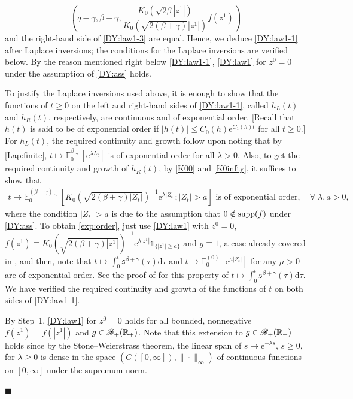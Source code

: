 \documentclass[12pt, twoside]{article}
\numberwithin{figure}{section}
\newcommand{\e}{{\mathrm e}}
\newcommand{\1}{\mathds 1}
\newcommand{\B}{\mathscr B}
\newcommand{\da}{{\downarrow}}
\newcommand{\supp}{{\rm supp}}
\newcommand{\E}{{\mathbb E}}
\renewcommand{\d}{{\mathrm d}}
\newcommand{\R}{{\Bbb R}}
\newcommand{\2}{{\mathbf 1}}
\newcommand{\s}{{\mathfrak s}}
\renewenvironment{proof}[1][\proofname]{\noindent {\bfseries #1.}\;}{\hfill\ensuremath{\blacksquare}\\}
\begin{document}
\begin{proof}[Proof of Theorem~\ref{thm:formulas}]
\[
\left(q-\gamma,\beta+\gamma,\frac{K_0(\sqrt{2\beta}|z^1|)}{K_0(\sqrt{2(\beta+\gamma)}|z^1|)}f(z^1)\right)
\]
and the right-hand side of \eqref{DY:law1-3} are equal. Hence, we deduce \eqref{DY:law1-1} after Laplace inversions; the conditions for the Laplace inversions are verified below. By the reason mentioned right below \eqref{DY:law1-1}, \eqref{DY:law1} for $z^0=0$ under the assumption of \eqref{DY:ass} holds.

To justify the Laplace inversions used above, it is enough to show that the functions of $t\geq 0$ on the left and right-hand sides of \eqref{DY:law1-1}, called $h_L(t)$ and $h_R(t)$, respectively, are continuous and of exponential order. [Recall that $h(t)$ is said to be of exponential order if $|h(t)|\leq C_0(h)\e^{C_1(h)t}$ for all $t\geq 0$.]  For $h_L(t)$, the required continuity and growth follow upon noting that by \eqref{Lap:finite}, $t\mapsto \E^{\beta\da}_0[\e^{\lambda L_t}]$ is of exponential order for all $\lambda>0$.  Also, to get the required continuity and growth of $h_R(t)$, by \eqref{K00} and \eqref{K0infty}, it suffices to show that 
\begin{align}\label{exp:order}
t\mapsto \E^{(\beta+\gamma)\da}_0[K_0(\sqrt{2(\beta+\gamma)|Z_t|})^{-1}\e^{\lambda |Z_t|};|Z_t|>a]\mbox{ is of exponential order},\quad \forall\;\lambda,a>0, 
\end{align}
where the condition $|Z_t|>a$ is due to the assumption that $0\notin \supp(f)$ under \eqref{DY:ass}.
To obtain \eqref{exp:order}, just use \eqref{DY:law1} with $z^0=0$, $f(z^1)\equiv K_0(\sqrt{2(\beta+\gamma)|z^1|})^{-1} \e^{\lambda|z^1|}\1_{\{|z^1|\geq a\}}$ and $g\equiv 1$, a case already covered in \cite[Theorem~2.10]{C:BES}, and then, note that $t\mapsto \int_0^t \s^{\beta+\gamma}(\tau)\d \tau$ and $t\mapsto \E^{(0)}_0[\e^{\mu|Z_t|}]$ for any $\mu>0$ are of exponential order. See the proof of \cite[Lemma~3.2]{C:BES} for this property of  $t\mapsto \int_0^t \s^{\beta+\gamma}(\tau)\d \tau$. 
We have verified the required continuity and growth of the functions of $t$ on both sides of \eqref{DY:law1-1}.\smallskip 

 By Step~1, \eqref{DY:law1} for $z^0=0$ holds for all bounded, nonnegative $f(z^1)=f(|z^1|)$ and $g\in \B_+(\R_+)$. Note that this extension to $g\in \B_+(\R_+)$ holds since by the Stone--Weierstrass theorem, the linear span of $s\mapsto \e^{-\lambda s}$, $s\geq 0$, for $\lambda\geq 0$ is dense in the space $(C([0,\infty]),\|\cdot\|_\infty)$ of continuous functions on $[0,\infty]$ under the supremum norm. \smallskip 


\end{proof}
\end{document}
